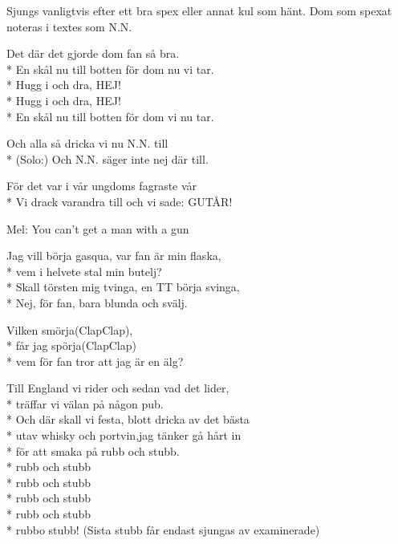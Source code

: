 \begin{SongText}
    \begin{SongInfo}
        Sjungs vanligtvis efter ett bra spex eller annat kul som hänt. Dom som spexat noteras i textes som N.N.
    \end{SongInfo}
    \begin{SongVerse}
        Det där det gjorde dom fan så bra.\\*%
        En skål nu till botten för dom nu vi tar.\\*%
        Hugg i och dra, HEJ!\\*%
        Hugg i och dra, HEJ!\\*%
        En skål nu till botten för dom vi nu tar.
    \end{SongVerse}
    \begin{SongVerse}
        Och alla så dricka vi nu N.N. till\\*%
        (Solo:) Och N.N. säger inte nej där till.
    \end{SongVerse}
    \begin{SongVerse}
        För det var i vår ungdoms fagraste vår\\*%
        Vi drack varandra till och vi sade: GUTÅR! 
    \end{SongVerse}
\end{SongText}
\begin{SongText}
    \begin{SongInfo}
        Mel: You can’t get a man with a gun
    \end{SongInfo}
    \begin{SongVerse}
        Jag vill börja gasqua, var fan är min flaska,\\*%
        vem i helvete stal min butelj?\\*%
        Skall törsten mig tvinga, en TT börja svinga,\\*%
        Nej, för fan, bara blunda och svälj.
    \end{SongVerse}
    \begin{SongVerse}
        Vilken smörja(ClapClap),\\*%
        får jag spörja(ClapClap)\\*%
        vem för fan tror att jag är en älg?
    \end{SongVerse}
    \begin{SongVerse}
        Till England vi rider och sedan vad det lider,\\*%
        träffar vi välan på någon pub.\\*%
        Och där skall vi festa, blott dricka av det bästa\\*%
        utav whisky och portvin,jag tänker gå hårt in\\*%
        för att smaka på rubb och stubb.\\*%
        rubb och stubb\\*%
        rubb och stubb\\*%
        rubb och stubb\\*%
        rubb och stubb\\*%
        rubbo stubb! (Sista stubb får endast sjungas av 
        examinerade)
    \end{SongVerse}
\end{SongText}
